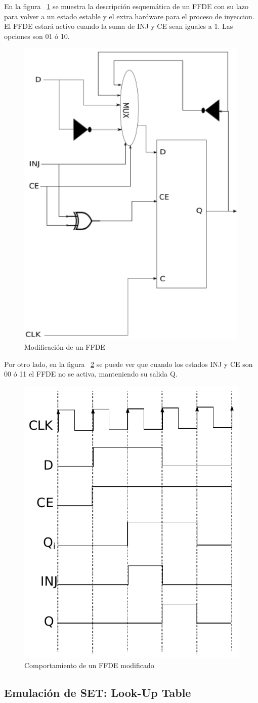 En la figura ~\ref{FFDE} se muestra la descripción esquemática de un FFDE con su lazo para volver  a un estado estable y el extra hardware para el proceso de inyeccion. El FFDE estará activo cuando la suma de INJ y CE sean iguales a 1. Las opciones son  01 ó 10.  


\begin{figure}[H]
	\centering
	\includegraphics[width=0.5 \textwidth]{img/FFDE.png}
	\caption{Modificación de un FFDE }
	\label{FFDE}
\end{figure}

Por otro lado, en la figura ~\ref{FFDESS}  se puede ver que cuando los estados INJ  y CE son 00 ó 11 el FFDE  no se activa, manteniendo su salida Q.

\begin{figure}[H]
	\centering
	\includegraphics[width=0.4 \textwidth]{img/FFDES.pdf}
	\caption{Comportamiento de un FFDE  modificado }
	\label{FFDESS}
\end{figure}


\subsection{Emulación de SET: Look-Up Table }

